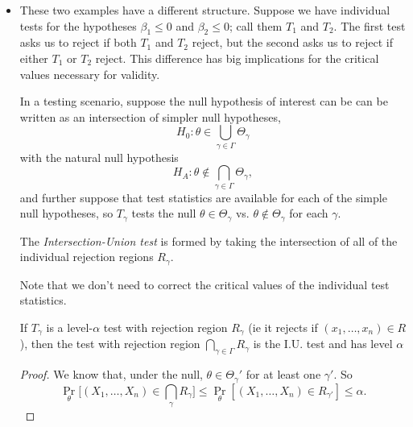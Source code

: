 \begin{itemize}[leftmargin=0pt]
\item These two examples have a different structure.  Suppose we have
  individual tests for the hypotheses $\beta_1 \leq 0$ and $\beta_2
  \leq 0$; call them $T_1$ and $T_2$.  The first test asks us to
  reject if both $T_1$ and $T_2$ reject, but the second asks us to
  reject if either $T_1$ or $T_2$ reject.  This difference has big
  implications for the critical values necessary for validity.

  \begin{defn}
    In a testing scenario, suppose the null hypothesis of interest can
    be can be written as an intersection of simpler null hypotheses,
    \begin{equation*}
      H_0: \theta \in \bigcup_{\gamma \in \Gamma} \Theta_\gamma
    \end{equation*}
    with the natural null hypothesis
    \begin{equation*}
      H_A: \theta \notin \bigcap_{\gamma \in \Gamma} \Theta_\gamma,
    \end{equation*}
    and further suppose that test statistics are available for each of
    the simple null hypotheses, so $T_\gamma$ tests the null $\theta
    \in \Theta_\gamma$ vs. $\theta \notin \Theta_\gamma$ for each
    $\gamma$.
    
    The \emph{Intersection-Union test} is formed by taking the
    intersection of all of the individual rejection regions $R_\gamma$.
  \end{defn}
  
  Note that we don't need to correct the critical values of the
  individual test statistics.

  \begin{thm}
    If $T_\gamma$ is a level-$\alpha$ test with rejection region
    $R_\gamma$ (ie it rejects if $(x_1,\dots,x_n) \in R$), then the
    test with rejection region $\bigcap_{\gamma \in \Gamma} R_\gamma$
    is the I.U. test and has level $\alpha$
  \end{thm}

  \begin{proof}
    We know that, under the null, $\theta \in \Theta_\gamma'$ for at
    least one $\gamma'$.  So
    \begin{equation*}
      \Pr_\theta\big[(X_1,\dots,X_n) \in \bigcap_\gamma R_\gamma\big]
      \leq \Pr_\theta[(X_1,\dots, X_n) \in R_{\gamma'}]
      \leq \alpha.
    \end{equation*}
  \end{proof}


\end{itemize}
